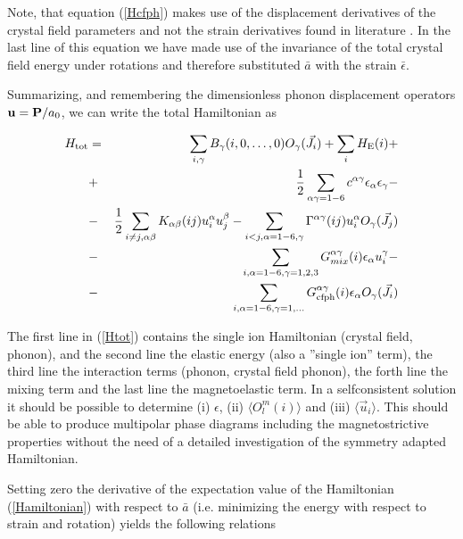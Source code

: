Note, that equation (\ref{Hcfph}) makes use of the displacement derivatives of the 
crystal field parameters and not the strain derivatives found in literature
 \cite{palmer78-2465,jensen75-320,mcewen91-3298}.
In the last line of this equation we have made use of the invariance of the
total crystal field energy under rotations
and therefore substituted $\bar a$ with the strain $\bar \epsilon$.

Summarizing, and remembering the dimensionless phonon displacement operators
$\mathbf u = \mathbf P / a_0$, we can write the total Hamiltonian as

\begin{eqnarray}\label{Htot}
H_{\rm tot} & = & \sum_{i,\gamma} B_{\gamma}(i,0,\dots,0) O_{\gamma}(\vec J_i) + \sum_{i} H_{\rm E}(i) + \\
&+&\frac{1}{2}\sum_{\alpha\gamma=1-6} c^{\alpha\gamma} \epsilon_{\alpha}\epsilon_{\gamma} - \nonumber \\
&-&\frac{1}{2}\sum_{i\ne j,\alpha\beta} K_{\alpha\beta}(ij) u_{i}^{\alpha}u_{j}^{\beta} 
-\sum_{i<j,\alpha=1-6,\gamma}\Gamma^{\alpha\gamma}(ij) u^{\alpha}_i O_{\gamma}(\vec J_j)
\nonumber \\
&-&\sum_{i,\alpha=1-6,\gamma=1,2,3} G_{mix}^{\alpha\gamma}(i) \epsilon_{\alpha} u_{i}^{\gamma} - \nonumber \\
&-&\sum_{i,\alpha=1-6,\gamma=1,...} G_{\rm cfph}^{\alpha\gamma}(i) \epsilon_{\alpha} O_{\gamma}(\vec J_i) \nonumber
 \end{eqnarray}



The first line in (\ref{Htot}) contains the single ion Hamiltonian (crystal field, phonon), 
and the second line the elastic energy (also a ''single ion'' term),
the third line the interaction terms (phonon, crystal field phonon), 
the forth line the mixing term and 
the last line  the magnetoelastic term. 
In a selfconsistent solution it should be possible to 
determine (i) $\epsilon$, (ii) $\langle O_l^m(i) \rangle $ and (iii)
$\langle \vec u_i \rangle$. This should be able to produce multipolar phase diagrams including the
magnetostrictive properties without the need of a detailed investigation of the symmetry adapted Hamiltonian.

Setting zero the derivative of the expectation value of the Hamiltonian (\ref{Hamiltonian}) with respect to
 $\bar a$  (i.e. minimizing the energy with respect to strain and  rotation) 
yields the following relations 

